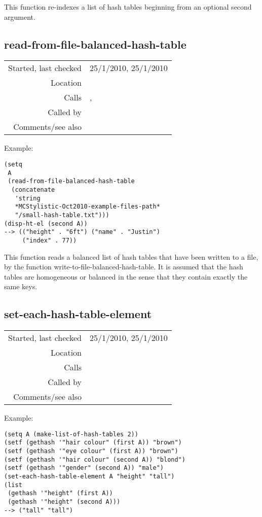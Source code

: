 \noindent This function re-indexes a list of hash
tables beginning from an optional second argument.


\subsection*{read-from-file-balanced-hash-table}\label{fun:read-from-file-balanced-hash-table}

\vspace{0.3cm}
\begin{tabular}{r|p{8cm}}
Started, last checked & 25/1/2010, 25/1/2010 \\
Location & \nameref{sec:hash-tables} \\
Calls & \nameref{fun:make-list-of-hash-tables}, \nameref{fun:read-from-file} \\
Called by & \\
Comments/see also &
\end{tabular}

\vspace{0.5cm}
\noindent Example:
\begin{verbatim}
(setq
 A
 (read-from-file-balanced-hash-table
  (concatenate
   'string
   *MCStylistic-Oct2010-example-files-path*
   "/small-hash-table.txt")))
(disp-ht-el (second A))
--> (("height" . "6ft") ("name" . "Justin")
     ("index" . 77))
\end{verbatim}

\noindent This function reads a balanced list of hash
tables that have been written to a file, by the
function write-to-file-balanced-hash-table. It is
assumed that the hash tables are homogeneous or
balanced in the sense that they contain exactly the
same keys.


\subsection*{set-each-hash-table-element}\label{fun:set-each-hash-table-element}

\vspace{0.3cm}
\begin{tabular}{r|p{8cm}}
Started, last checked & 25/1/2010, 25/1/2010 \\
Location & \nameref{sec:hash-tables} \\
Calls & \\
Called by & \\
Comments/see also &
\end{tabular}

\vspace{0.5cm}
\noindent Example:
\begin{verbatim}
(setq A (make-list-of-hash-tables 2))
(setf (gethash '"hair colour" (first A)) "brown")
(setf (gethash '"eye colour" (first A)) "brown")
(setf (gethash '"hair colour" (second A)) "blond")
(setf (gethash '"gender" (second A)) "male")
(set-each-hash-table-element A "height" "tall")
(list
 (gethash '"height" (first A))
 (gethash '"height" (second A)))
--> ("tall" "tall")
\end{verbatim}

